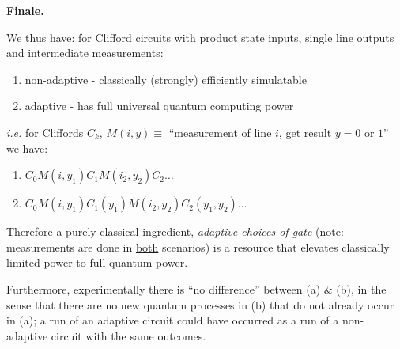 \documentclass[]{article}
\renewcommand{\it}[1]{\textit{#1}}
\begin{document}
\textbf{Finale.}

We thus have: for Clifford circuits with product state inputs, single line outputs and intermediate measurements:
\begin{enumerate}[label=(\alph*)]
	\item non-adaptive - classically (strongly) efficiently simulatable
	\item adaptive - has full universal quantum computing power
\end{enumerate}
\it{i.e.} for Cliffords $C_k$, $M(i,y) \equiv$ ``measurement of line $i$, get result $y = 0$ or $1$'' we have:
\begin{enumerate}[label=(\alph*)]
	\item $C_0 M(i,y_1)C_1M(i_2,y_2)C_2\dots$
	\item $C_0M(i,y_1)C_1(y_1)M(i_2,y_2)C_2(y_1,y_2)\dots$
\end{enumerate}
Therefore a purely classical ingredient, \it{adaptive choices of gate} (note: measurements are done in \underline{both} scenarios) is a resource that elevates classically limited power to full quantum power.

Furthermore, experimentally there is ``no difference'' between (a) \& (b), in the sense that there are no new quantum processes in (b) that do not already occur in (a); a run of an adaptive circuit could have occurred as a run of a non-adaptive circuit with the same outcomes.
\end{document}
